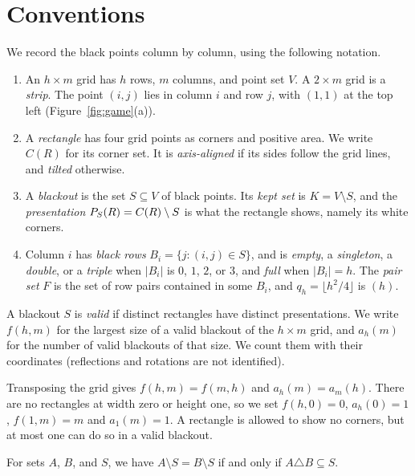 \section{Conventions}\label{sec:conv}

We record the black points column by column, using the following notation.

\begin{enumerate}[(1),leftmargin=*]
\item An $h\times m$ grid has $h$ rows, $m$ columns, and point set $V$. A $2\times m$ grid
is a \emph{strip}. The point $(i,j)$ lies in column $i$ and row $j$, with $(1,1)$ at the
top left (Figure~\ref{fig:game}(a)).
\item A \emph{rectangle} has four grid points as corners and positive area.
We write $C(R)$ for its corner set. It is \emph{axis-aligned} if its sides
follow the grid lines, and \emph{tilted} otherwise.
\item A \emph{blackout} is the set $S\subseteq V$ of black points. Its
\emph{kept set} is $K=V\setminus S$, and the \emph{presentation}
$P_S(R)=C(R)\setminus S$ is what the rectangle shows, namely its white corners.
\item Column $i$ has \emph{black rows} $B_i=\{j:(i,j)\in S\}$, and is \emph{empty}, a
\emph{singleton}, a \emph{double}, or a \emph{triple} when $|B_i|$ is $0$, $1$, $2$, or
$3$, and \emph{full} when $|B_i|=h$. The \emph{pair set} $F$ is the set of row pairs
contained in some $B_i$, and $q_h=\lfloor h^2/4\rfloor$ is $(h)$.
\end{enumerate}

\begin{definition}\label{def:valid}
A blackout $S$ is \emph{valid} if distinct rectangles have distinct
presentations. We write $f(h,m)$ for the largest size of a valid blackout
of the $h\times m$ grid, and $a_h(m)$ for the number of valid blackouts of that
size. We count them with their coordinates (reflections and rotations are
not identified).
\end{definition}

Transposing the grid gives $f(h,m)=f(m,h)$ and $a_h(m)=a_m(h)$.
There are no rectangles at width zero or height one, so we set
$f(h,0)=0$, $a_h(0)=1$, $f(1,m)=m$ and $a_1(m)=1$. A rectangle is allowed
to show no corners, but at most one can do so in a valid blackout.

\begin{lemma}\label{lem:diff}
For sets $A$, $B$, and $S$, we have $A\setminus S=B\setminus S$ if and only if
$A\triangle B\subseteq S$.
\end{lemma}

